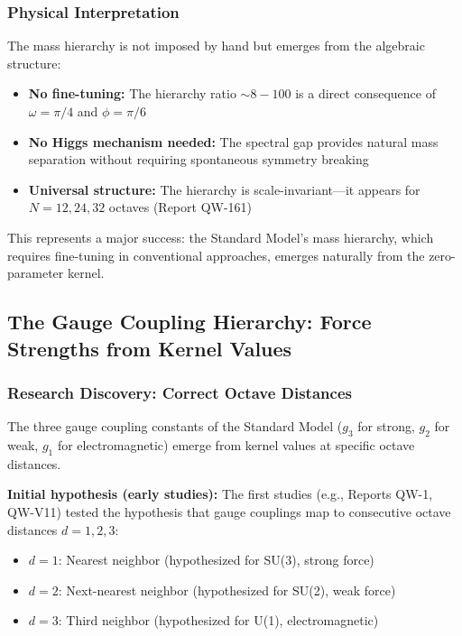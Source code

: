 \documentclass[11pt, a4paper]{article}
\begin{document}
\subsubsection{Physical Interpretation}

The mass hierarchy is not imposed by hand but emerges from the algebraic structure:
\begin{itemize}
    \item \textbf{No fine-tuning:} The hierarchy ratio $\sim 8-100$ is a direct consequence of $\omega = \pi/4$ and $\phi = \pi/6$
    \item \textbf{No Higgs mechanism needed:} The spectral gap provides natural mass separation without requiring spontaneous symmetry breaking
    \item \textbf{Universal structure:} The hierarchy is scale-invariant—it appears for $N = 12, 24, 32$ octaves (Report QW-161)
\end{itemize}

This represents a major success: the Standard Model's mass hierarchy, which requires fine-tuning in conventional approaches, emerges naturally from the zero-parameter kernel.

\subsection{The Gauge Coupling Hierarchy: Force Strengths from Kernel Values}

\subsubsection{Research Discovery: Correct Octave Distances}

The three gauge coupling constants of the Standard Model ($g_3$ for strong, $g_2$ for weak, $g_1$ for electromagnetic) emerge from kernel values at specific octave distances.

\textbf{Initial hypothesis (early studies):} The first studies (e.g., Reports QW-1, QW-V11) tested the hypothesis that gauge couplings map to consecutive octave distances $d = 1, 2, 3$:
\begin{itemize}
    \item $d = 1$: Nearest neighbor (hypothesized for SU(3), strong force)
    \item $d = 2$: Next-nearest neighbor (hypothesized for SU(2), weak force)
    \item $d = 3$: Third neighbor (hypothesized for U(1), electromagnetic)
\end{itemize}
\end{document}
